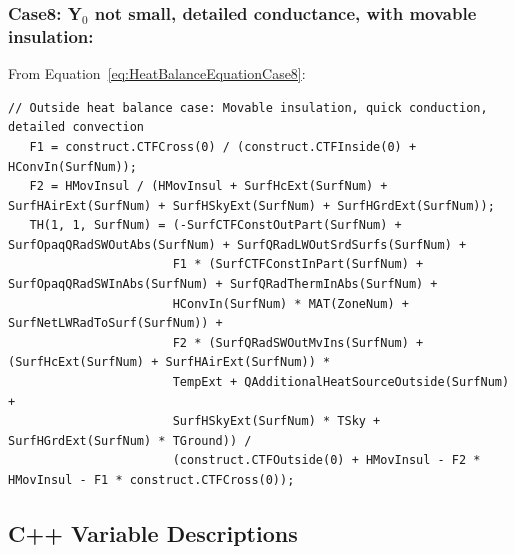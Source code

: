 \subsubsection{Case8: Y\(_{0}\) not small, detailed conductance, with movable insulation:}\label{case8-yux5f0-not-small-detailed-conductance-with-movable-insulation-1}

From Equation~\ref{eq:HeatBalanceEquationCase8}:

\begin{lstlisting}
// Outside heat balance case: Movable insulation, quick conduction, detailed convection
   F1 = construct.CTFCross(0) / (construct.CTFInside(0) + HConvIn(SurfNum));
   F2 = HMovInsul / (HMovInsul + SurfHcExt(SurfNum) + SurfHAirExt(SurfNum) + SurfHSkyExt(SurfNum) + SurfHGrdExt(SurfNum));
   TH(1, 1, SurfNum) = (-SurfCTFConstOutPart(SurfNum) + SurfOpaqQRadSWOutAbs(SurfNum) + SurfQRadLWOutSrdSurfs(SurfNum) +
                       F1 * (SurfCTFConstInPart(SurfNum) + SurfOpaqQRadSWInAbs(SurfNum) + SurfQRadThermInAbs(SurfNum) +
                       HConvIn(SurfNum) * MAT(ZoneNum) + SurfNetLWRadToSurf(SurfNum)) +
                       F2 * (SurfQRadSWOutMvIns(SurfNum) + (SurfHcExt(SurfNum) + SurfHAirExt(SurfNum)) *
                       TempExt + QAdditionalHeatSourceOutside(SurfNum) +
                       SurfHSkyExt(SurfNum) * TSky + SurfHGrdExt(SurfNum) * TGround)) /
                       (construct.CTFOutside(0) + HMovInsul - F2 * HMovInsul - F1 * construct.CTFCross(0));
\end{lstlisting}

\subsection{C++ Variable Descriptions}\label{c++-variable-descriptions}


